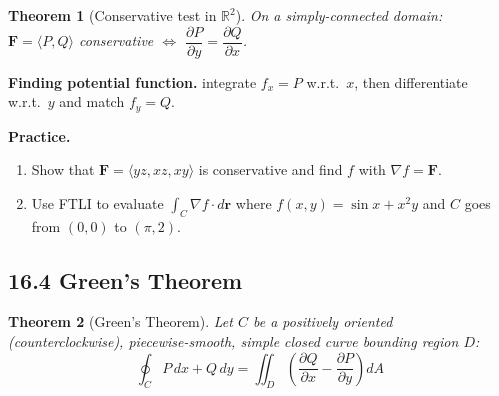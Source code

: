 \documentclass[12pt]{article}
\theoremstyle{compact}
\newtheorem{thm}{Theorem}[section]
\renewcommand{\vec}[1]{\mathbf{#1}}
\newcommand{\vv}[1]{\langle #1 \rangle}
\newcommand{\R}{\mathbb{R}}
\begin{document}
\begin{center}
\end{center}

\begin{thm}[Conservative test in $\R^2$]
On a simply-connected domain: $\vec{F}=\vv{P,Q}$ conservative $\iff$ $\dfrac{\partial P}{\partial y}=\dfrac{\partial Q}{\partial x}$.
\end{thm}

\textbf{Finding potential function.} integrate $f_x=P$ w.r.t.\ $x$, then differentiate w.r.t.\ $y$ and match $f_y=Q$.

\medskip\textbf{Practice.}
\begin{enumerate}[noitemsep]
  \item Show that $\vec{F}=\langle yz,xz,xy\rangle$ is conservative and find $f$ with $\nabla f=\vec{F}$.
  \item Use FTLI to evaluate $\int_C\nabla f\cdot d\vec{r}$ where $f(x,y)=\sin x+x^2y$ and $C$ goes from $(0,0)$ to $(\pi,2)$.
\end{enumerate}

\subsection{16.4 Green's Theorem}

\begin{thm}[Green's Theorem]
Let $C$ be a positively oriented (counterclockwise), piecewise-smooth, simple closed curve bounding region $D$:
\[
\oint_C P\,dx+Q\,dy = \iint_D \left(\frac{\partial Q}{\partial x}-\frac{\partial P}{\partial y}\right)dA
\]
\end{thm}
\end{document}

